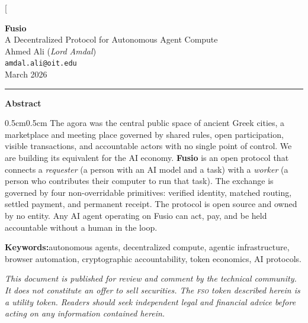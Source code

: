 \documentclass[10pt,twocolumn]{article}
\newcommand{\fso}{\textsc{fso}}
\begin{document}

\twocolumn[{%
  \begin{center}
    \vspace*{4pt}
    {\fontsize{22}{26}\selectfont\bfseries Fusio}\\[8pt]
    {\large A Decentralized Protocol for Autonomous Agent Compute}\\[10pt]
    {\normalsize Ahmed Ali \quad (\textit{Lord Amdal})}\\[3pt]
    {\small \texttt{amdal.ali@oit.edu}}\\[3pt]
    {\small\color{agorgray} March 2026}
  \end{center}

  \vspace{10pt}
  \noindent\rule{\linewidth}{0.8pt}
  \vspace{6pt}

  \begin{center}
    {\normalsize\bfseries Abstract}
  \end{center}
  \begin{adjustwidth}{0.5cm}{0.5cm}
  \normalsize
  The agora was the central public space of ancient Greek cities, a marketplace and meeting
  place governed by shared rules, open participation, visible transactions, and accountable
  actors with no single point of control. We are building its equivalent for the AI economy.
  \textbf{Fusio} is an open protocol that connects a \emph{requester} (a person with an AI model and a task) with a \emph{worker} (a person who contributes their computer to run that task). The exchange is governed by four non-overridable primitives: verified identity,
  matched routing, settled payment, and permanent receipt. The protocol is open source and
  owned by no entity. Any AI agent operating on Fusio can act, pay, and be held accountable
  without a human in the loop.

  \medskip\noindent
  \textbf{Keywords:}\enspace autonomous agents, decentralized compute, agentic infrastructure,
  browser automation, cryptographic accountability, token economics, AI protocols.
  \end{adjustwidth}

  \vspace{10pt}

  \noindent\colorbox{gray!12}{%
    \begin{minipage}{\dimexpr\linewidth-2\fboxsep\relax}
      \vspace{4pt}
      \small\itshape This document is published for review and comment by the technical
      community. It does not constitute an offer to sell securities. The \fso{} token
      described herein is a utility token. Readers should seek independent legal and
      financial advice before acting on any information contained herein.
      \vspace{4pt}
    \end{minipage}%
  }

}
\end{document}
